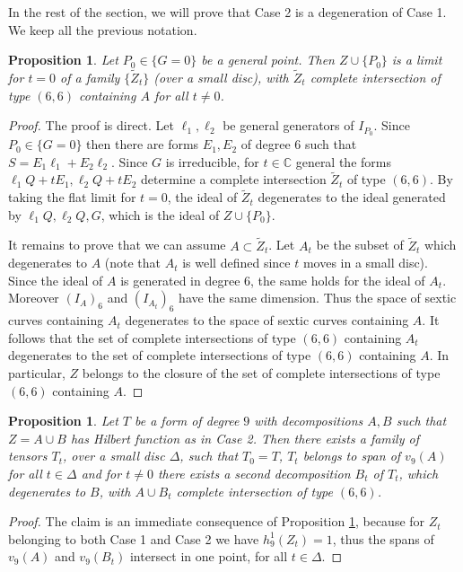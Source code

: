 \documentclass{amsart}
\newcommand{\C}{\mathbb{C}}
\newtheorem{prop0}[thm0]{Proposition}
\theoremstyle{definition}
\begin{document}
In the rest of the section, we will prove that Case 2 is a degeneration of Case 1. We keep all the previous notation.

\begin{prop0}\label{limiting2}
Let $ P_{0} \in \{G=0\} $ be a general point. Then  $ Z\cup\{P_0\} $ is a limit for $t=0$ of a family $\{ \tilde{Z}_t\}$ (over a small disc), with $ \tilde{Z}_t$  
complete intersection of type $ (6,6) $ containing $A$ for all $t\neq 0$.
\end{prop0}

\begin{proof}
The proof is direct. Let $ \ell_1,\ell_2$ be general generators of $I_{P_{0}}$. Since $P_0\in \{G=0\}$ then there are forms $E_1,E_2$ of 
degree $6$ such that $S=E_1\ell_1+E_2\ell_2$. Since $G$ is irreducible,  for $t\in \C$ general the forms $\ell_1Q+tE_1, \ell_2Q+tE_2$ 
determine a complete intersection $\tilde Z_t $ of type $(6,6)$. By taking the flat limit for $t=0$, the ideal of $\tilde Z_t$ degenerates to
the ideal generated by $\ell_1Q, \ell_2Q, G$, which is the ideal of $Z\cup\{P_0\}$. 

It remains to prove that we can assume $A\subset \tilde Z_t$. Let $A_t$ be the subset of $\tilde Z_t$ which degenerates to $A$ (note that $A_t$ is well defined since
$t$ moves in a small disc). Since the ideal of $A$ is generated in degree $6$, the same holds for the ideal of $A_t$. Moreover $(I_A)_6$
and $(I_{A_t})_6$  have the same dimension. Thus the space of  sextic curves
containing $A_t$ degenerates to the space of sextic curves containing $A$. It follows that the set of complete intersections of type $(6,6)$ containing
$A_t$ degenerates to the set of complete intersections of type $(6,6)$ containing $A$. In particular, $Z$ belongs to the closure
of the set of complete intersections of type $(6,6)$ containing $A$. 
\end{proof} 



\begin{prop0}\label{propCase2}
Let $T$ be a form of degree $9$ with decompositions $A,B$ such that $Z=A\cup B$ has Hilbert function as in Case 2. Then there exists a 
family of tensors $T_t$, over a small disc $\Delta$, such that $T_0=T$, $T_t$ belongs to span of   $v_9(A)$ for all $t\in \Delta$ and 
for $t\neq 0$ there exists a second decomposition $B_t$ of $T_t$, which degenerates to $B$, with $A\cup B_t$ complete intersection
of type $(6,6)$.
\end{prop0}
\begin{proof} The claim is an immediate consequence of Proposition \ref{limiting2}, because for $Z_t$ belonging to both Case 1 and Case 2 we have $h^1_9(Z_t)=1$,
thus the spans of $v_9(A)$ and $v_9(B_t)$ intersect in one point, for all $t\in\Delta$.
\end{proof}
\end{document}
